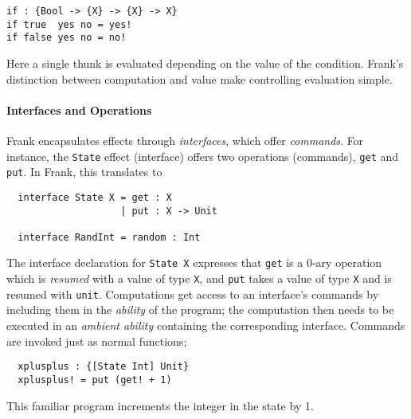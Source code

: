 \documentclass[msc,deptreport,cs]{infthesis} %
\newcommand{\code}[1]{\lstinline{#1}}
\newcommand{\todo}[1]
           {{\par\noindent\small\color{RoyalPurple}
  \framebox{\parbox{\dimexpr\linewidth-2\fboxsep-2\fboxrule}
    {\textbf{TODO:} #1}}}}
\begin{document}
\begin{lstlisting}
if : {Bool -> {X} -> {X} -> X}
if true  yes no = yes!
if false yes no = no!
\end{lstlisting}

\noindent Here a single thunk is evaluated depending on the value of the
condition. Frank's distinction between computation and value make controlling
evaluation simple.



\paragraph*{Interfaces and Operations}

Frank encapsulates effects through \emph{interfaces}, which offer
\emph{commands}. For instance, the \code{State} effect (interface) offers two
operations (commands), \code{get} and \code{put}. In Frank, this translates to

\begin{lstlisting}
  interface State X = get : X
                    | put : X -> Unit

  interface RandInt = random : Int
\end{lstlisting}

The interface declaration for \code{State X} expresses that \code{get} is a
0-ary operation which is \emph{resumed} with a value of type \code{X}, and
\code{put} takes a value of type \code{X} and is resumed with \code{unit}.
Computations get access to an interface's commands by including them in the
\emph{ability} of the program; the computation then needs to be executed in an
\emph{ambient ability} containing the corresponding interface. Commands are
invoked just as normal functions;

\begin{lstlisting}
  xplusplus : {[State Int] Unit}
  xplusplus! = put (get! + 1)
\end{lstlisting}

\noindent This familiar program increments the integer in the state by 1.
\end{document}

